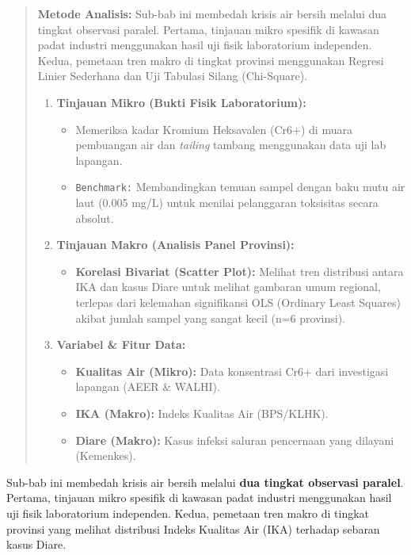 \documentclass[
]{article}
\providecommand{\tightlist}{%
  \setlength{\itemsep}{0pt}\setlength{\parskip}{0pt}}
\begin{document}
\begin{quote}
\textbf{Metode Analisis:} Sub-bab ini membedah krisis air bersih melalui
dua tingkat observasi paralel. Pertama, tinjauan mikro spesifik di
kawasan padat industri menggunakan hasil uji fisik laboratorium
independen. Kedua, pemetaan tren makro di tingkat provinsi menggunakan
Regresi Linier Sederhana dan Uji Tabulasi Silang (Chi-Square).

\begin{enumerate}
\def\labelenumi{\arabic{enumi}.}
\tightlist
\item
  \textbf{Tinjauan Mikro (Bukti Fisik Laboratorium):}

  \begin{itemize}
  \tightlist
  \item
    Memeriksa kadar Kromium Heksavalen (Cr6+) di muara pembuangan air
    dan \emph{tailing} tambang menggunakan data uji lab lapangan.
  \item
    \texttt{Benchmark:} Membandingkan temuan sampel dengan baku mutu air
    laut (0.005 mg/L) untuk menilai pelanggaran toksisitas secara
    absolut.
  \end{itemize}
\item
  \textbf{Tinjauan Makro (Analisis Panel Provinsi):}

  \begin{itemize}
  \tightlist
  \item
    \textbf{Korelasi Bivariat (Scatter Plot):} Melihat tren distribusi
    antara IKA dan kasus Diare untuk melihat gambaran umum regional,
    terlepas dari kelemahan signifikansi OLS (Ordinary Least Squares)
    akibat jumlah sampel yang sangat kecil (n=6 provinsi).
  \end{itemize}
\item
  \textbf{Variabel \& Fitur Data:}

  \begin{itemize}
  \tightlist
  \item
    \textbf{Kualitas Air (Mikro):} Data konsentrasi Cr6+ dari
    investigasi lapangan (AEER \& WALHI).
  \item
    \textbf{IKA (Makro):} Indeks Kualitas Air (BPS/KLHK).
  \item
    \textbf{Diare (Makro):} Kasus infeksi saluran pencernaan yang
    dilayani (Kemenkes).
  \end{itemize}
\end{enumerate}
\end{quote}

Sub-bab ini membedah krisis air bersih melalui \textbf{dua tingkat
observasi paralel}. Pertama, tinjauan mikro spesifik di kawasan padat
industri menggunakan hasil uji fisik laboratorium independen. Kedua,
pemetaan tren makro di tingkat provinsi yang melihat distribusi Indeks
Kualitas Air (IKA) terhadap sebaran kasus Diare.
\end{document}
